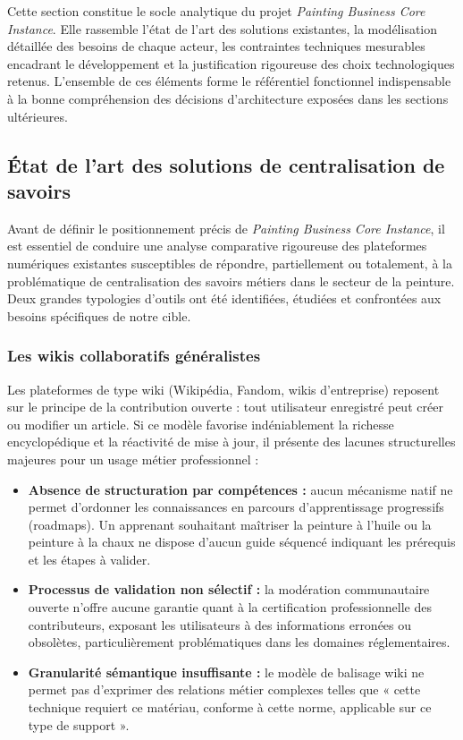 \documentclass[12pt,a4paper]{report}
\begin{document}
\noindent
Cette section constitue le socle analytique du projet \textit{Painting Business Core Instance}. Elle rassemble l'état de l'art des solutions existantes, la modélisation détaillée des besoins de chaque acteur, les contraintes techniques mesurables encadrant le développement et la justification rigoureuse des choix technologiques retenus. L'ensemble de ces éléments forme le référentiel fonctionnel indispensable à la bonne compréhension des décisions d'architecture exposées dans les sections ultérieures.

\subsection{État de l'art des solutions de centralisation de savoirs}

\noindent
Avant de définir le positionnement précis de \textit{Painting Business Core Instance}, il est essentiel de conduire une analyse comparative rigoureuse des plateformes numériques existantes susceptibles de répondre, partiellement ou totalement, à la problématique de centralisation des savoirs métiers dans le secteur de la peinture. Deux grandes typologies d'outils ont été identifiées, étudiées et confrontées aux besoins spécifiques de notre cible.

\subsubsection*{Les wikis collaboratifs généralistes}

\noindent
Les plateformes de type wiki (Wikipédia, Fandom, wikis d'entreprise) reposent sur le principe de la contribution ouverte : tout utilisateur enregistré peut créer ou modifier un article. Si ce modèle favorise indéniablement la richesse encyclopédique et la réactivité de mise à jour, il présente des lacunes structurelles majeures pour un usage métier professionnel :

\begin{itemize}[leftmargin=1.5cm, itemsep=4pt]
    \item \textbf{Absence de structuration par compétences :} aucun mécanisme natif ne permet d'ordonner les connaissances en parcours d'apprentissage progressifs (roadmaps). Un apprenant souhaitant maîtriser la peinture à l'huile ou la peinture à la chaux ne dispose d'aucun guide séquencé indiquant les prérequis et les étapes à valider.
    \item \textbf{Processus de validation non sélectif :} la modération communautaire ouverte n'offre aucune garantie quant à la certification professionnelle des contributeurs, exposant les utilisateurs à des informations erronées ou obsolètes, particulièrement problématiques dans les domaines réglementaires.
    \item \textbf{Granularité sémantique insuffisante :} le modèle de balisage wiki ne permet pas d'exprimer des relations métier complexes telles que « cette technique requiert ce matériau, conforme à cette norme, applicable sur ce type de support ».
\end{itemize}
\end{document}
